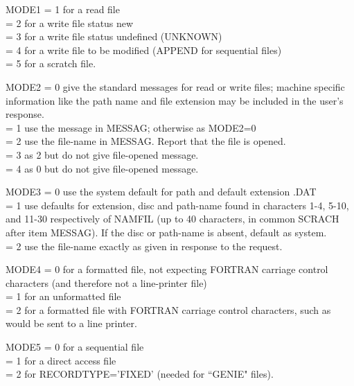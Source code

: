 \begin{list} {} {\setlength{\labelwidth}{3cm}
  \setlength{\parsep}{-1ex}
  \setlength{\leftmargin}{\labelwidth}
 \addtolength{\leftmargin}{1cm}} 
\item[MODE1 \hfill] = 1 for a read file\\
       = 2 for a write file status new\\
       = 3 for a write file status undefined (UNKNOWN)\\
       = 4 for a write file to be modified (APPEND for sequential files)\\
       = 5 for a scratch file.
 
\item[MODE2 \hfill] = 0 give the standard messages for
 read or write files; machine specific
           information like the path name and file extension 
           may be included in
           the user's response.\\
       = 1 use the message in MESSAG; otherwise as MODE2=0\\
       = 2 use the file-name in MESSAG. Report that the file is opened.\\
       = 3 as 2 but do not give file-opened message.\\
       = 4 as 0 but do not give file-opened message.
 
\item[MODE3 \hfill] = 0 use the system default for path and default 
           extension .DAT\\
       = 1 use defaults for extension, disc and path-name found in characters
           1-4, 5-10, and 11-30 respectively of NAMFIL (up to 40
           characters, in common SCRACH after item MESSAG). If the disc or
           path-name is absent, default as system.\\
       = 2 use the file-name exactly as given in response to the request.
 
\item[MODE4 \hfill] = 0 for a formatted file, not expecting FORTRAN 
           carriage control
           characters (and therefore not a line-printer file)\\
       = 1 for an unformatted file\\
       = 2 for a formatted file with FORTRAN carriage control characters,
           such as would be sent to a line printer.
 
\item[MODE5 \hfill] = 0 for a sequential file\\
       = 1 for a direct access file\\
       = 2 for RECORDTYPE='FIXED' (needed for ``GENIE" files).\end{list}
 
